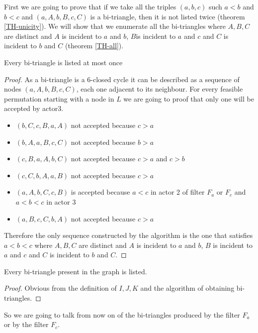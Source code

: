 First we are going to prove that if we take all the triples $(a,b,c)$  such $a<b$ and $b<c$  and    $(a,A,b,B,c,C)$ is a bi-triangle, then it is not listed twice (theorem \ref{TH-unicity}).  We will show that we  enumerate all the bi-triangles  where $A,B,C$  are distinct and $A$ is incident to $a$ and $b$, $B$is incident to $a$ and $c$ and $C$ is incident to $b$ and $C$ (theorem \ref{TH-all}). 
\begin{theorem} \label{TH-unicity}Every bi-triangle is listed at most once 

\end{theorem}
\begin{proof}
As a bi-triangle is a 6-closed cycle it can be described as a sequence of nodes  $(a,A,b,B,c,C)$, each one adjacent to its neighbour. For every feasible permutation  starting with a node in $L$ we are going to proof that only one will be accepted by actor3.  
\begin{itemize}
    \item $(b,C,c,B,a,A)$ not accepted because $c > a$
    \item $(b,A,a,B,c,C)$ not accepted because $b > a$
    \item $(c,B,a,A,b,C)$ not accepted because $c > a$ and $c > b$
    \item $(c,C,b,A,a,B)$ not accepted because $c > a  $
    \item $(a,A,b,C,c,B)$ is accepted because $a < c $ in actor 2 of filter $F_a$ or $F_c$ and $a < b <c$  in actor 3
    \item $(a,B,c,C,b,A)$ not accepted because $c > a$
\end{itemize}


Therefore the  only sequence constructed by the algorithm is the one that satisfies $a < b < c $ where $A,B,C$  are distinct and $A$ is incident to $a$ and $b$, $B$ is incident to $a$ and $c$ and $C$ is incident to $b$ and $C$.
\end{proof}


\begin{theorem}\label{TH-all}Every bi-triangle present in the graph is listed.

\end{theorem}

\begin{proof}

Obvious  from the definition of $I,J,K$  and the algorithm of obtaining bi-triangles. 
\iffalse
Lets assume that a bi-triangle $(a,A,b,B,c,C)$   will assume that $a$ is the smallest element in the set $\{a,b,c\}$ and $c$ is the bigger.
When actor 1 in fiter $F_a$1 ends reading all the edges, $\{A,B\} \subseteq W_a$. Also When actor 1 in fiter $F_c$1 ends reading all the edges, $\{B,C\} \subseteq W_c$. 

AS $a < c$  in filter $F_a$ the pair $(a,c)$  will be added to D
$DW$. When actor 3 in filter $F_a$ receives $(b, W_b)$ will add to $BT$ because of the non empty intersection. Therefore the bi-triangle $(a,A,b,B,c,C)$ can be recognized
\fi
\end{proof}
\iffalse So we are going to talk from now on of the bi-triangles produced by the filter $F_a$ or by the filter $F_c$.

